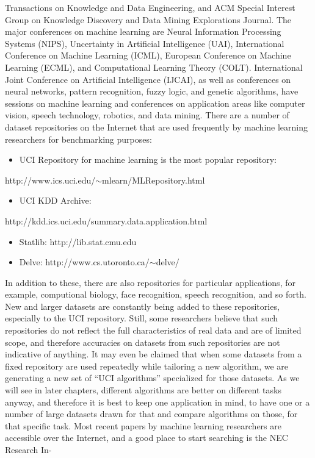 Transactions on Knowledge and Data Engineering, and ACM Special Interest Group on Knowledge Discovery and Data Mining Explorations Journal. The major conferences on machine learning are Neural Information Processing Systems (NIPS), Uncertainty in Artificial Intelligence (UAI), International Conference on Machine Learning (ICML), European Conference on Machine Learning (ECML), and Computational Learning Theory (COLT). International Joint Conference on Artificial Intelligence (IJCAI), as well as conferences on neural networks, pattern recognition, fuzzy logic, and genetic algorithms, have sessions on machine learning and conferences on application areas like computer vision, speech technology, robotics, and data mining. There are a number of dataset repositories on the Internet that are used frequently by machine learning researchers for benchmarking purposes:

\begin{itemize}
\item UCI Repository for machine learning is the most popular repository:
\end{itemize}

http://www.ics.uci.edu/$\sim$mlearn/MLRepository.html

\begin{itemize}
\item UCI KDD Archive:
\end{itemize}

http://kdd.ics.uci.edu/summary.data.application.html

\begin{itemize}
\item Statlib: http://lib.stat.cmu.edu
\end{itemize}

\begin{itemize}
\item Delve: http://www.cs.utoronto.ca/$\sim$delve/
\end{itemize}

In addition to these, there are also repositories for particular applications, for example, computional biology, face recognition, speech recognition, and so forth. New and larger datasets are constantly being added to these repositories, especially to the UCI repository. Still, some researchers believe that such repositories do not reflect the full characteristics of real data and are of limited scope, and therefore accuracies on datasets from such repositories are not indicative of anything. It may even be claimed that when some datasets from a fixed repository are used repeatedly while tailoring a new algorithm, we are generating a new set of “UCI algorithms” specialized for those datasets. As we will see in later chapters, different algorithms are better on different tasks anyway, and therefore it is best to keep one application in mind, to have one or a number of large datasets drawn for that and compare algorithms on those, for that specific task. Most recent papers by machine learning researchers are accessible over the Internet, and a good place to start searching is the NEC Research In-


